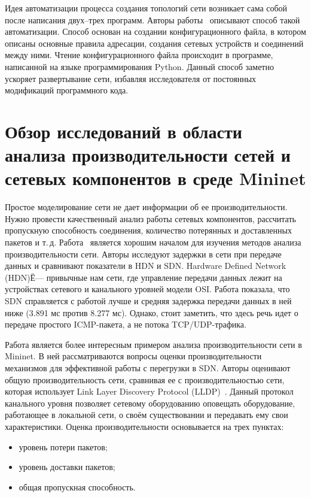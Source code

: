 Идея автоматизации процесса создания топологий сети возникает сама
собой после написания двух--трех программ. Авторы
работы~\cite{article_iosctfim} описывают способ такой
автоматизации. Способ основан на создании конфигурационного файла, в
котором описаны основные правила адресации, создания сетевых устройств
и соединений между ними.  Чтение конфигурационного файла происходит в
программе, написанной на языке программирования Python. Данный способ
заметно ускоряет развертывание сети, избавляя исследователя от
постоянных модификаций программного кода.

\section{Обзор исследований в области анализа производительности сетей
  и сетевых компонентов в среде Mininet}

Простое моделирование сети не дает информации об ее
производительности.  Нужно провести качественный анализ работы сетевых
компонентов, рассчитать пропускную способность соединения, количество
потерянных и доставленных пакетов и
т.\,д. Работа~\cite{article_paoasdnum} является хорошим началом для
изучения методов анализа производительности сети. Авторы исследуют
задержки в сети при передаче данных и сравнивают показатели в HDN и
SDN. Hardware Defined Network (HDN)Ё--- привычные нам сети, где
управление передачи данных лежит на устройствах сетевого и канального
уровней модели OSI. Работа показала, что SDN справляется с работой
лучше и средняя задержка передачи данных в ней ниже (3.891 мс против
8.277 мс). Однако, стоит заметить, что здесь речь идет о передаче
простого ICMP-пакета, а не потока TCP/UDP-трафика.

Работа \cite{article_paoccmisdn} является более интересным примером
анализа производительности сети в Mininet. В ней рассматриваются вопросы
оценки производительности механизмов для эффективной работы с перегрузки
в SDN. Авторы оценивают общую производительность сети, сравнивая ее с
производительностью сети, которая использует Link Layer Discovery
Protocol (LLDP)~\cite{lldp}. Данный протокол канального уровня
позволяет сетевому оборудованию оповещать оборудование, работающее в
локальной сети, о своём существовании и передавать ему свои
характеристики. %
Оценка производительности основывается
на трех пунктах:
\begin{itemize}
\item уровень потери пакетов;
\item уровень доставки пакетов;
\item общая пропускная способность.
\end{itemize}

